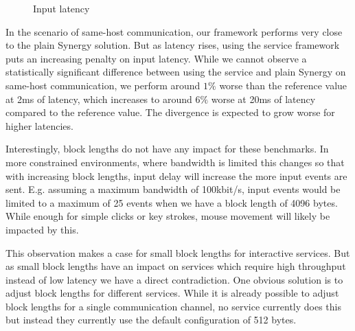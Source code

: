 \begin{figure}[t]
    \centering
    \caption{Input latency}
    \label{fig:input-latency}
\end{figure}


In the scenario of same-host communication, our framework performs very close to the plain Synergy solution.
But as latency rises, using the service framework puts an increasing penalty on input latency.
While we cannot observe a statistically significant difference between using the service and plain Synergy on same-host communication, we perform around $1\%$ worse than the reference value at 2ms of latency, which increases to around $6\%$ worse at 20ms of latency compared to the reference value.
The divergence is expected to grow worse for higher latencies.

Interestingly, block lengths do not have any impact for these benchmarks.
In more constrained environments, where bandwidth is limited this changes so that with increasing block lengths, input delay will increase the more input events are sent.
E.g. assuming a maximum bandwidth of 100kbit/s, input events would be limited to a maximum of 25 events when we have a block length of 4096 bytes.
While enough for simple clicks or key strokes, mouse movement will likely be impacted by this.

This observation makes a case for small block lengths for interactive services.
But as small block lengths have an impact on services which require high throughput instead of low latency we have a direct contradiction.
One obvious solution is to adjust block lengths for different services.
While it is already possible to adjust block lengths for a single communication channel, no service currently does this but instead they currently use the default configuration of 512 bytes.


